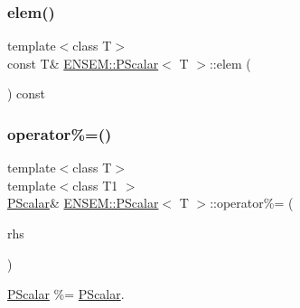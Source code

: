 \mbox{\label{classENSEM_1_1PScalar_ac20d84af6de415de7ad63292ad278542}} 
\subsubsection{\texorpdfstring{elem()}{elem()}\hspace{0.1cm}{\footnotesize\ttfamily [6/6]}}
{\footnotesize\ttfamily template$<$class T$>$ \\
const T\& \mbox{\hyperlink{classENSEM_1_1PScalar}{E\+N\+S\+E\+M\+::\+P\+Scalar}}$<$ T $>$\+::elem (\begin{DoxyParamCaption}{ }\end{DoxyParamCaption}) const\hspace{0.3cm}{\ttfamily [inline]}}

\mbox{\label{classENSEM_1_1PScalar_ab583ff2667eba7d2bed2acbd3c15e43e}} 
\subsubsection{\texorpdfstring{operator\%=()}{operator\%=()}\hspace{0.1cm}{\footnotesize\ttfamily [1/3]}}
{\footnotesize\ttfamily template$<$class T$>$ \\
template$<$class T1 $>$ \\
\mbox{\hyperlink{classENSEM_1_1PScalar}{P\+Scalar}}\& \mbox{\hyperlink{classENSEM_1_1PScalar}{E\+N\+S\+E\+M\+::\+P\+Scalar}}$<$ T $>$\+::operator\%= (\begin{DoxyParamCaption}\item[{const \mbox{\hyperlink{classENSEM_1_1PScalar}{P\+Scalar}}$<$ T1 $>$ \&}]{rhs }\end{DoxyParamCaption})\hspace{0.3cm}{\ttfamily [inline]}}



\mbox{\hyperlink{classENSEM_1_1PScalar}{P\+Scalar}} \%= \mbox{\hyperlink{classENSEM_1_1PScalar}{P\+Scalar}}. 

